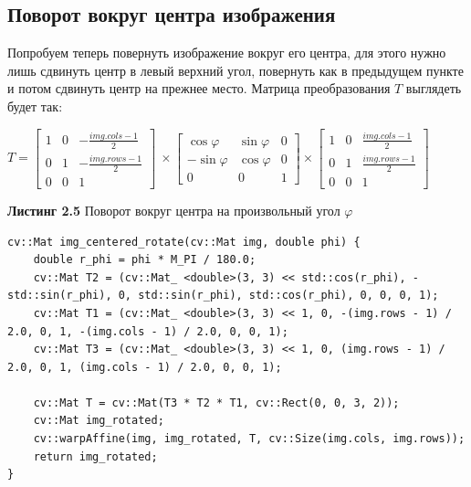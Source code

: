     \subsection{Поворот вокруг центра изображения}
    Попробуем теперь повернуть изображение вокруг его центра, для этого 
    нужно лишь сдвинуть центр в левый верхний угол, повернуть как в предыдущем пункте и потом сдвинуть центр на прежнее место. Матрица преобразования $T$ выглядеть будет так:
    \begin{center}
        $
        T =
        \begin{bmatrix}
            1 & 0 & -\frac{img.cols - 1}{2}\\
            0 & 1 & -\frac{img.rows - 1}{2}
            \\0 & 0 & 1
        \end{bmatrix}
        \
        \times
        \begin{bmatrix}
            \cos \varphi & \sin \varphi & 0\\
            -\sin \varphi & \cos \varphi & 0\\
            0 & 0 & 1
        \end{bmatrix}
        \times
        \begin{bmatrix}
            1 & 0 & \frac{img.cols - 1}{2}\\
            0 & 1 & \frac{img.rows - 1}{2}\\
            0 & 0 & 1
        \end{bmatrix}
        $
    \end{center}
    \noindent \textbf{Листинг 2.5} Поворот вокруг центра на произвольный угол $\varphi$
    \begin{lstlisting}
cv::Mat img_centered_rotate(cv::Mat img, double phi) {
    double r_phi = phi * M_PI / 180.0;
    cv::Mat T2 = (cv::Mat_ <double>(3, 3) << std::cos(r_phi), -std::sin(r_phi), 0, std::sin(r_phi), std::cos(r_phi), 0, 0, 0, 1);
    cv::Mat T1 = (cv::Mat_ <double>(3, 3) << 1, 0, -(img.rows - 1) / 2.0, 0, 1, -(img.cols - 1) / 2.0, 0, 0, 1);
    cv::Mat T3 = (cv::Mat_ <double>(3, 3) << 1, 0, (img.rows - 1) / 2.0, 0, 1, (img.cols - 1) / 2.0, 0, 0, 1);

    cv::Mat T = cv::Mat(T3 * T2 * T1, cv::Rect(0, 0, 3, 2));
    cv::Mat img_rotated;
    cv::warpAffine(img, img_rotated, T, cv::Size(img.cols, img.rows));
    return img_rotated;
}

    \end{lstlisting}
